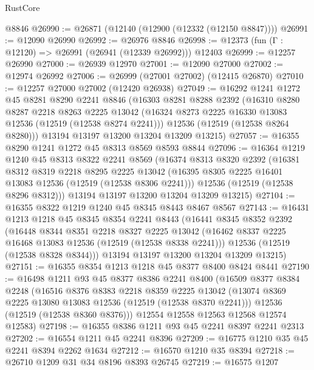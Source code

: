 \begin{lexlean}{RustCore}
\begin{coremodule}
    @8846
@26990 := @26871 (@12140 (@12900 (@12332 (@12150 @8847))))
@26991 := @12090 @26990
@26992 := @26976 @8846
@26998 := @12373 (fun (Γ : @12120) => @26991 (@26941 (@12339 @26992))) @12403
@26999 := @12257 @26990
@27000 := @26939 @12970
@27001 := @12090 @27000
@27002 := @12974 @26992
@27006 := @26999 (@27001 @27002) (@12415 @26870)
@27010 := @12257 @27000 @27002 (@12420 @26938)
@27049 := @16292
    @1241
    @1272
    @45
    @8281
    @8290
    @2241
    @8846
    (@16303
      @8281
      @8288
      @2392
      (@16310
        @8280
        @8287
        @2218
        @8263
        @2225
        @13042
        (@16324 @8273 @2225 @16330 @13083 @12536 (@12519 (@12538 @8274 @2241)))
        @12536
        (@12519 (@12538 @8264 @8280)))
      @13194
      @13197
      @13200
      @13204
      @13209
      @13215)
@27057 := @16355 @8290 @1241 @1272 @45 @8313 @8569 @8593 @8844
@27096 := @16364
    @1219
    @1240
    @45
    @8313
    @8322
    @2241
    @8569
    (@16374
      @8313
      @8320
      @2392
      (@16381
        @8312
        @8319
        @2218
        @8295
        @2225
        @13042
        (@16395 @8305 @2225 @16401 @13083 @12536 (@12519 (@12538 @8306 @2241)))
        @12536
        (@12519 (@12538 @8296 @8312)))
      @13194
      @13197
      @13200
      @13204
      @13209
      @13215)
@27104 := @16355 @8322 @1219 @1240 @45 @8345 @8443 @8467 @8567
@27143 := @16431
    @1213
    @1218
    @45
    @8345
    @8354
    @2241
    @8443
    (@16441
      @8345
      @8352
      @2392
      (@16448
        @8344
        @8351
        @2218
        @8327
        @2225
        @13042
        (@16462 @8337 @2225 @16468 @13083 @12536 (@12519 (@12538 @8338 @2241)))
        @12536
        (@12519 (@12538 @8328 @8344)))
      @13194
      @13197
      @13200
      @13204
      @13209
      @13215)
@27151 := @16355 @8354 @1213 @1218 @45 @8377 @8400 @8424 @8441
@27190 := @16498
    @1211
    @93
    @45
    @8377
    @8386
    @2241
    @8400
    (@16509
      @8377
      @8384
      @2248
      (@16516
        @8376
        @8383
        @2218
        @8359
        @2225
        @13042
        (@13074 @8369 @2225 @13080 @13083 @12536 (@12519 (@12538 @8370 @2241)))
        @12536
        (@12519 (@12538 @8360 @8376)))
      @12554
      @12558
      @12563
      @12568
      @12574
      @12583)
@27198 := @16355 @8386 @1211 @93 @45 @2241 @8397 @2241 @2313
@27202 := @16554 @1211 @45 @2241 @8396
@27209 := @16775 @1210 @35 @45 @2241 @8394 @2262 @1634
@27212 := @16570 @1210 @35 @8394
@27218 := @26710 @1209 @31 @34 @8196 @8393 @26745
@27219 := @16575 @1207

\end{coremodule}
\end{lexlean}
